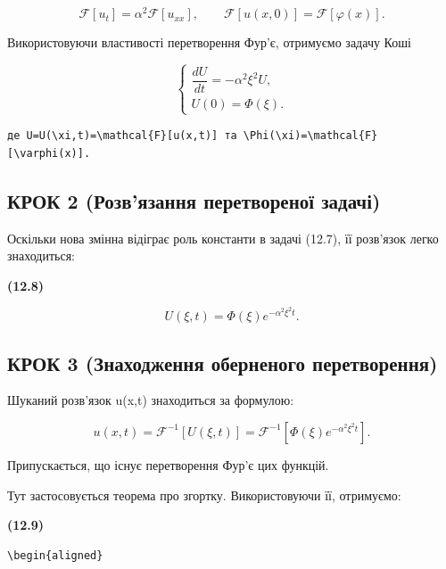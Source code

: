 \documentclass[
  ukrainian,
]{article}
\begin{document}
\[
\mathcal{F}[u_t] = \alpha^2 \mathcal{F}[u_{xx}],\qquad
\mathcal{F}[u(x,0)] = \mathcal{F}[\varphi(x)].
\]

Використовуючи властивості перетворення Фур'є, отримуємо задачу Коші

\[
\begin{cases}
\dfrac{dU}{dt}=-\alpha^2\xi^2U,\\
U(0)=\Phi(\xi).
\end{cases}
\]

\begin{verbatim}
де U=U(\xi,t)=\mathcal{F}[u(x,t)] та \Phi(\xi)=\mathcal{F}[\varphi(x)].
\end{verbatim}

\subsection{КРОК 2 (Розв'язання перетвореної
задачі)}\label{ux43aux440ux43eux43a-2-ux440ux43eux437ux432ux44fux437ux430ux43dux43dux44f-ux43fux435ux440ux435ux442ux432ux43eux440ux435ux43dux43eux457-ux437ux430ux434ux430ux447ux456}

Оскільки нова змінна відіграє роль константи в задачі (12.7), її
розв'язок легко знаходиться:

\textbf{(12.8)}

\[
U(\xi,t)=\Phi(\xi)e^{-\alpha^2\xi^2 t}.
\]

\subsection{КРОК 3 (Знаходження оберненого
перетворення)}\label{ux43aux440ux43eux43a-3-ux437ux43dux430ux445ux43eux434ux436ux435ux43dux43dux44f-ux43eux431ux435ux440ux43dux435ux43dux43eux433ux43e-ux43fux435ux440ux435ux442ux432ux43eux440ux435ux43dux43dux44f}

Шуканий розв'язок u(x,t) знаходиться за формулою:

\[
u(x, t) = \mathcal{F}^{-1}\!\left[U(\xi, t)\right]
= \mathcal{F}^{-1}\!\left[\Phi(\xi)e^{-\alpha^2 \xi^2 t}\right].
\]

Припускається, що існує перетворення Фур'є цих функцій.

Тут застосовується теорема про згортку. Використовуючи її, отримуємо:

\textbf{(12.9)}

\begin{verbatim}
\begin{aligned}
\end{verbatim}
\end{document}
